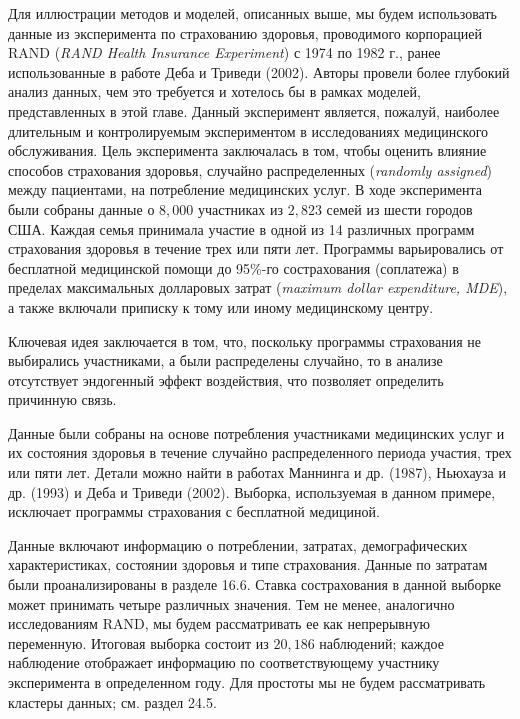 \noindent
Для иллюстрации методов и моделей, описанных выше, мы будем использовать данные из эксперимента по страхованию здоровья, проводимого корпорацией RAND (\textit{RAND Health Insurance Experiment}) с 1974 по 1982 г., ранее использованные в работе Деба и Триведи (2002). Авторы провели более глубокий анализ данных, чем это требуется и хотелось бы в рамках моделей, представленных в этой главе. Данный эксперимент является, пожалуй, наиболее длительным и контролируемым экспериментом в исследованиях медицинского обслуживания. Цель эксперимента заключалась в том, чтобы оценить влияние способов страхования здоровья, случайно распределенных (\textit{randomly assigned}) между пациентами, на потребление медицинских услуг.
В ходе эксперимента были собраны данные о $8,000$ участниках из $2,823$ семей из шести городов США. Каждая семья принимала участие в одной из 14 различных программ страхования здоровья в течение трех или пяти лет. Программы варьировались от бесплатной медицинской помощи до 95\%-го сострахования (соплатежа) в пределах максимальных долларовых затрат (\textit{maximum dollar expenditure, MDE}), а также включали приписку к тому или иному медицинскому центру.

Ключевая идея заключается в том, что, поскольку программы страхования не выбирались участниками, а были распределены случайно, то в анализе отсутствует эндогенный эффект воздействия, что позволяет определить причинную связь.

Данные были собраны на основе потребления участниками медицинских услуг и их состояния здоровья в течение случайно распределенного периода участия, трех или пяти лет. Детали можно найти в работах Маннинга и др. (1987), Ньюхауза и др. (1993) и Деба и Триведи (2002). Выборка, используемая в данном примере, исключает программы страхования с бесплатной медициной.

Данные включают информацию о потреблении, затратах, демографических характеристиках, состоянии здоровья и типе страхования. Данные по затратам были проанализированы в разделе 16.6. %
Ставка сострахования в данной выборке может принимать четыре различных значения. Тем не менее, аналогично исследованиям RAND, мы будем рассматривать ее как непрерывную переменную. Итоговая выборка состоит из $20,186$ наблюдений; каждое наблюдение отображает информацию по соответствующему участнику эксперимента в определенном году. Для простоты мы не будем рассматривать кластеры данных; см. раздел
24.5. %

